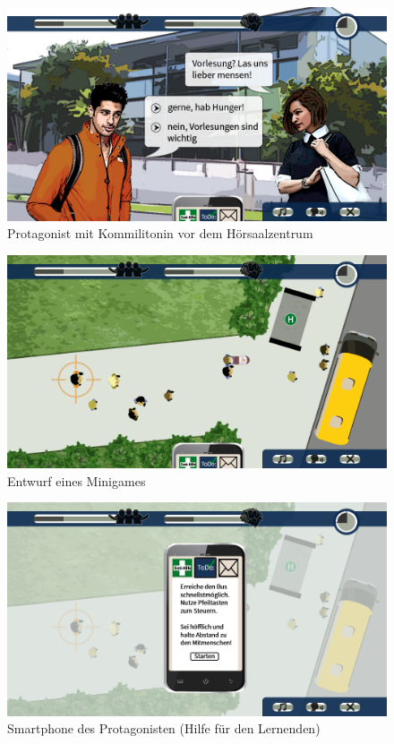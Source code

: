 \documentclass[a4paper,10pt]{article}
\begin{document}
\begin{figure}
	\centering
	\includegraphics[width=\textwidth]{./figures/hsz.png}
	\caption{Protagonist mit Kommilitonin vor dem Hörsaalzentrum}
\end{figure}

\begin{figure}
	\centering
	\includegraphics[width=\textwidth]{./figures/busspiel.png}
	\caption{Entwurf eines Minigames}
\end{figure}

\begin{figure}
	\centering
	\includegraphics[width=\textwidth]{./figures/smartphone.png}
	\caption{Smartphone des Protagonisten (Hilfe für den Lernenden)}
\end{figure}
\end{document}
